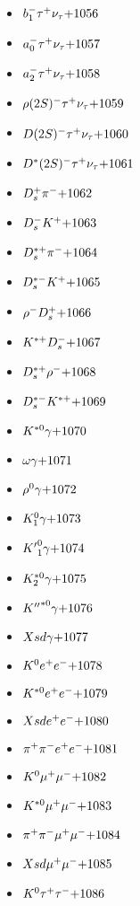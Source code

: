 \begin{multicols}{3}
\begin{itemize}
 \item $ b_{1}^{-} \tau^{+} \nu_{\tau} \hfill{+1056}$
 \item $ a_{0}^{-} \tau^{+} \nu_{\tau} \hfill{+1057}$
 \item $ a_{2}^{-} \tau^{+} \nu_{\tau} \hfill{+1058}$
 \item $ \rho(2S)^{-} \tau^{+} \nu_{\tau} \hfill{+1059}$
 \item $ D(2S)^{-} \tau^{+} \nu_{\tau} \hfill{+1060}$
 \item $ D^{*}(2S)^{-} \tau^{+} \nu_{\tau} \hfill{+1061}$
 \item $ D_{s}^{+} \pi^{-} \hfill{+1062}$
 \item $ D_{s}^{-} K^{+} \hfill{+1063}$
 \item $ D_{s}^{*+} \pi^{-} \hfill{+1064}$
 \item $ D_{s}^{*-} K^{+} \hfill{+1065}$
 \item $ \rho^{-} D_{s}^{+} \hfill{+1066}$
 \item $ K^{*+} D_{s}^{-} \hfill{+1067}$
 \item $ D_{s}^{*+} \rho^{-} \hfill{+1068}$
 \item $ D_{s}^{*-} K^{*+} \hfill{+1069}$
 \item $ K^{*0} \gamma \hfill{+1070}$
 \item $ \omega \gamma \hfill{+1071}$
 \item $ \rho^{0} \gamma \hfill{+1072}$
 \item $ K_{1}^{0} \gamma \hfill{+1073}$
 \item $ {K^{\prime}}_{1}^{0} \gamma \hfill{+1074}$
 \item $ K_{2}^{*0} \gamma \hfill{+1075}$
 \item $ {K^{\prime\prime}}^{*0} \gamma \hfill{+1076}$
 \item $ Xsd \gamma \hfill{+1077}$
 \item $ K^{0} e^{+} e^{-} \hfill{+1078}$
 \item $ K^{*0} e^{+} e^{-} \hfill{+1079}$
 \item $ Xsd e^{+} e^{-} \hfill{+1080}$
 \item $ \pi^{+} \pi^{-} e^{+} e^{-} \hfill{+1081}$
 \item $ K^{0} \mu^{+} \mu^{-} \hfill{+1082}$
 \item $ K^{*0} \mu^{+} \mu^{-} \hfill{+1083}$
 \item $ \pi^{+} \pi^{-} \mu^{+} \mu^{-} \hfill{+1084}$
 \item $ Xsd \mu^{+} \mu^{-} \hfill{+1085}$
 \item $ K^{0} \tau^{+} \tau^{-} \hfill{+1086}$

\end{itemize}
\end{multicols}
